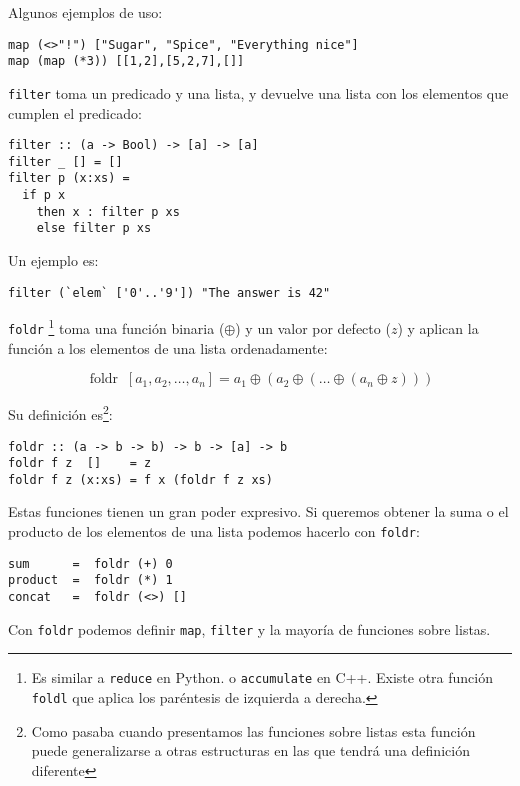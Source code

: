 Algunos ejemplos de uso:
\begin{lstlisting}
map (<>"!") ["Sugar", "Spice", "Everything nice"]
map (map (*3)) [[1,2],[5,2,7],[]]
\end{lstlisting}

\texttt{filter} toma un predicado y una lista, y devuelve una lista con los elementos
que cumplen el predicado:
\begin{lstlisting}
filter :: (a -> Bool) -> [a] -> [a]
filter _ [] = []
filter p (x:xs) =
  if p x
    then x : filter p xs
    else filter p xs
\end{lstlisting}

Un ejemplo es:

\begin{lstlisting}
filter (`elem` ['0'..'9']) "The answer is 42"
\end{lstlisting}

\texttt{foldr}
\footnote{Es similar a \texttt{reduce} en Python. o \texttt{accumulate} en C++.
Existe otra función \texttt{foldl} que aplica los paréntesis de izquierda a derecha.}
toma una función binaria ($\oplus$) y un valor por defecto ($z$) y
aplican la función a los elementos de una lista ordenadamente:

\begin{equation*}
\operatorname{foldr} \; [a_1 , a_2 , \dots , a_n] =
 a_1 \oplus  (a_2 \oplus  (\dots \oplus  (a_n \oplus  z )))
\end{equation*}

Su definición es\footnote{Como pasaba cuando presentamos las funciones sobre listas esta función puede generalizarse a otras estructuras en las que tendrá una definición diferente}:

\begin{lstlisting}
foldr :: (a -> b -> b) -> b -> [a] -> b
foldr f z  []    = z
foldr f z (x:xs) = f x (foldr f z xs)
\end{lstlisting}

Estas funciones tienen un gran poder expresivo. Si queremos obtener la suma
o el producto de los elementos de una lista podemos hacerlo con \texttt{foldr}:

\begin{lstlisting}
sum      =  foldr (+) 0
product  =  foldr (*) 1
concat   =  foldr (<>) []
\end{lstlisting}

Con \texttt{foldr} podemos definir \texttt{map}, \texttt{filter} y la mayoría de
funciones sobre listas.
